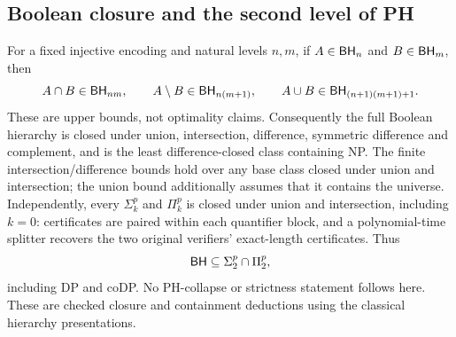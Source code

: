 \begin{result}
\subsection{Boolean closure and the second level of PH}
For a fixed injective encoding and natural levels $n,m$, if
$A\in\mathsf{BH}_n$ and $B\in\mathsf{BH}_m$, then
\[
A\cap B\in\mathsf{BH}_{nm},\qquad
A\setminus B\in\mathsf{BH}_{n(m+1)},\qquad
A\cup B\in\mathsf{BH}_{(n+1)(m+1)+1}.
\]
These are upper bounds, not optimality claims. Consequently the full Boolean
hierarchy is closed under union, intersection, difference, symmetric difference
and complement, and is the least difference-closed class containing NP.
The finite intersection/difference bounds hold over any base class closed under
union and intersection; the union bound additionally assumes that it contains
the universe. Independently, every $\Sigma_k^p$ and $\Pi_k^p$ is closed under
union and intersection, including $k=0$: certificates are paired within each
quantifier block, and a polynomial-time splitter recovers the two original
verifiers' exact-length certificates. Thus
\[
\mathsf{BH}\subseteq\Sigma_2^p\cap\Pi_2^p,
\]
including DP and coDP. No PH-collapse or strictness statement follows here.
These are checked closure and containment deductions using the classical
hierarchy presentations.\citep{CaiEtAl1988,Stockmeyer1976,AroraBarak09}
\end{result}


